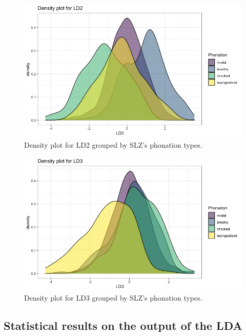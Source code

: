 \documentclass[12pt, letterpaper]{article}
\begin{document}
\begin{figure}[!h]
    \centering
    \includegraphics[width=.75\linewidth]{Images/ld2_density.png}
    \caption{Density plot for LD2 grouped by SLZ's phonation types.}
    \label{fig:LD2}
\end{figure}

\begin{figure}[!h]
    \centering
    \includegraphics[width=.75\linewidth]{Images/ld3_density.png}
    \caption{Density plot for LD3 grouped by SLZ's phonation types.}
    \label{fig:LD3}
\end{figure}


\subsection{Statistical results on the output of the LDA} \label{sec:Stats}
\end{document}
